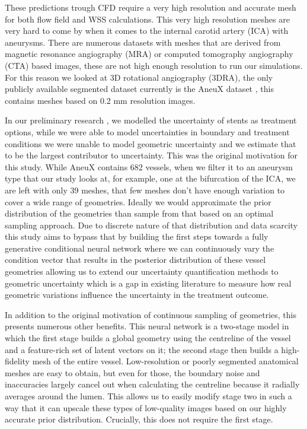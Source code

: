 \documentclass[12pt,a4paper]{article}
\begin{document}
These predictions trough CFD require a very high resolution and accurate mesh for both flow field and WSS calculations. This very high resolution meshes are very hard to come by when it comes to the internal carotid artery (ICA) with aneurysms. There are numerous datasets with meshes that are derived from magnetic resonance angiography (MRA) or computed tomography angiography (CTA) based images, these are not high enough resolution to run our simulations. For this reason we looked at 3D rotational angiography (3DRA), the only publicly available segmented dataset currently is the AneuX dataset \citep{juchler2022}, this contains meshes based on 0.2 mm resolution images.

In our preliminary research \citep{miklos2025}, we modelled the uncertainty of stents as treatment options, while we were able to model uncertainties in boundary and treatment conditions we were unable to model geometric uncertainty and we estimate that to be the largest contributor to uncertainty. This was the original motivation for this study. While AneuX contains 682 vessels, when we filter it to an aneurysm type that our study looks at, for example, one at the bifurcation of the ICA, we are left with only 39 meshes, that few meshes don't have enough variation to cover a wide range of geometries. Ideally we would approximate the prior distribution of the geometries than sample from that based on an optimal sampling approach. Due to discrete nature of that distribution and data scarcity this study aims to bypass that by building the first steps towards a fully generative conditional neural network where we can continuously vary the condition vector that results in the posterior distribution of these vessel geometries allowing us to extend our uncertainty quantification methods to geometric uncertainty which is a gap in existing literature to measure how real geometric variations influence the uncertainty in the treatment outcome.

In addition to the original motivation of continuous sampling of geometries, this presents numerous other benefits. This neural network is a two-stage model in which the first stage builds a global geometry using the centreline of the vessel and a feature-rich set of latent vectors on it; the second stage then builds a high-fidelity mesh of the entire vessel. Low-resolution or poorly segmented anatomical meshes are easy to obtain, but even for those, the boundary noise and inaccuracies largely cancel out when calculating the centreline because it radially averages around the lumen. This allows us to easily modify stage two in such a way that it can upscale these types of low-quality images based on our highly accurate prior distribution. Crucially, this does not require the first stage.
\end{document}
